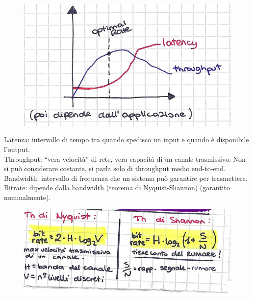 \begin{figure}
 \begin{center}\includegraphics[width=1\linewidth]{Figures//01/optrate.png}
  \end{center}
\end{figure}
\newpage

\noindent {}Latenza: intervallo di tempo tra quando spedisco un input e quando è disponibile l'output.\\

\noindent {}Throughput: ``vera velocità'' di rete, vera capacità di un canale trasmissivo. Non si può considerare costante, si parla solo di throughput medio end-to-end.\\

\noindent {}Bandwidth: intervallo di frequenza che un sistema può garantire per trasmettere. Bitrate: dipende dalla bandwidth (teorema di Nyquist-Shannon) (garantito nominalmente).

\begin{figure} [h]
    \centering
    \includegraphics[width=0.5\linewidth]{Figures//01/shannon-nyquist.png}
\end{figure}

